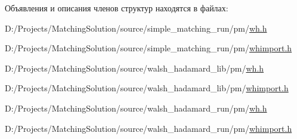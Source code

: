 Объявления и описания членов структур находятся в файлах:\begin{CompactItemize}
\item 
D:/Projects/MatchingSolution/source/simple\_\-matching\_\-run/pm/\hyperlink{simple__matching__run_2pm_2wh_8h}{wh.h}\item 
D:/Projects/MatchingSolution/source/simple\_\-matching\_\-run/pm/\hyperlink{simple__matching__run_2pm_2whimport_8h}{whimport.h}\item 
D:/Projects/MatchingSolution/source/walsh\_\-hadamard\_\-lib/pm/\hyperlink{walsh__hadamard__lib_2pm_2wh_8h}{wh.h}\item 
D:/Projects/MatchingSolution/source/walsh\_\-hadamard\_\-lib/pm/\hyperlink{walsh__hadamard__lib_2pm_2whimport_8h}{whimport.h}\item 
D:/Projects/MatchingSolution/source/walsh\_\-hadamard\_\-run/pm/\hyperlink{walsh__hadamard__run_2pm_2wh_8h}{wh.h}\item 
D:/Projects/MatchingSolution/source/walsh\_\-hadamard\_\-run/pm/\hyperlink{walsh__hadamard__run_2pm_2whimport_8h}{whimport.h}\end{CompactItemize}
